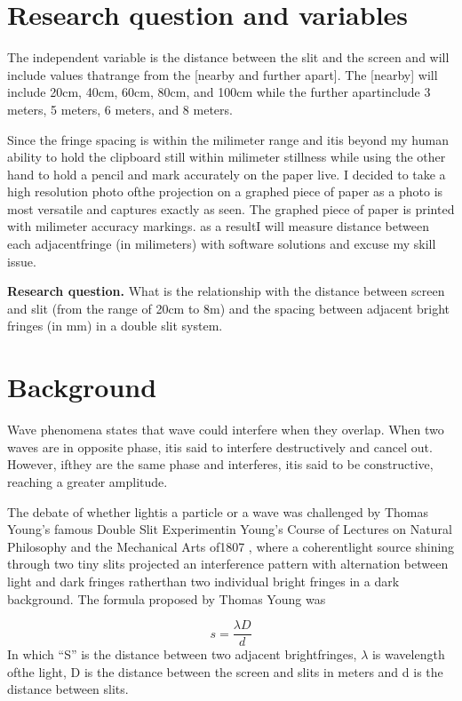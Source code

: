\documentclass[11pt]{article}
\begin{document}

\section{Research question and variables}
The independent variable is the distance between the slit and the screen and will include values thatrange from the [nearby and further apart]. The [nearby] will include 20cm, 40cm, 60cm, 80cm, and 100cm while the further apartinclude 3 meters, 5 meters, 6 meters, and 8 meters.

Since the fringe spacing is within the milimeter range and itis beyond my human ability to hold the clipboard still within milimeter stillness while using the other hand to hold a pencil and mark accurately on the paper live. I decided to take a high resolution photo ofthe projection on a graphed piece of paper as a photo is most versatile and captures exactly as seen. The graphed piece of paper is printed with milimeter accuracy markings. as a resultI will measure distance between each adjacentfringe (in milimeters) with software solutions and excuse my skill issue.

\textbf{Research question.} What is the relationship with the distance between screen and slit (from the range of 20cm to 8m) and the spacing between adjacent bright fringes (in mm) in a double slit system.

\section{Background}
Wave phenomena states that wave could interfere when they overlap. When two waves are in opposite phase, itis said to interfere destructively and cancel out. However, ifthey are the same phase and interferes, itis said to be constructive, reaching a greater amplitude.

The debate of whether lightis a particle or a wave was challenged by Thomas Young's famous Double Slit Experimentin Young's Course of Lectures on Natural Philosophy and the Mechanical Arts of1807 , where a coherentlight source shining through two tiny slits projected an interference pattern with alternation between light and dark fringes ratherthan two individual bright fringes in a dark background. The formula proposed by Thomas Young was

\begin{equation} s = \frac{\lambda D}{d} \end{equation}
In which ``S'' is the distance between two adjacent brightfringes, \ensuremath{\lambda} is wavelength ofthe light, D is the distance between the screen and slits in meters and d is the distance between slits.
\end{document}
